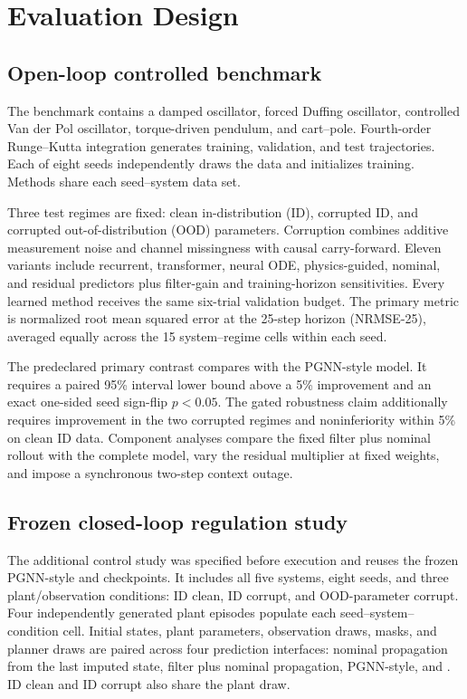 \section{Evaluation Design}

\subsection{Open-loop controlled benchmark}

The benchmark contains a damped oscillator, forced Duffing oscillator,
controlled Van der Pol oscillator, torque-driven pendulum, and cart--pole.
Fourth-order Runge--Kutta integration generates training, validation, and test
trajectories. Each of eight seeds independently draws the data and initializes
training. Methods share each seed--system data set.

Three test regimes are fixed: clean in-distribution (ID), corrupted ID, and
corrupted out-of-distribution (OOD) parameters. Corruption combines additive
measurement noise and channel missingness with causal carry-forward. Eleven
variants include recurrent, transformer, neural ODE, physics-guided, nominal,
and residual predictors plus filter-gain and training-horizon sensitivities.
Every learned method receives the same six-trial validation budget. The primary
metric is normalized root mean squared error at the 25-step horizon
(NRMSE-25), averaged equally across the 15 system--regime cells within each
seed.

The predeclared primary contrast compares \method{} with the PGNN-style model.
It requires a paired 95\% interval lower bound above a 5\% improvement and an
exact one-sided seed sign-flip $p<0.05$. The gated robustness claim additionally
requires improvement in the two corrupted regimes and noninferiority within
5\% on clean ID data. Component analyses compare the fixed filter plus nominal
rollout with the complete model, vary the residual multiplier at fixed weights,
and impose a synchronous two-step context outage.

\subsection{Frozen closed-loop regulation study}

The additional control study was specified before execution and reuses the
frozen PGNN-style and \method{} checkpoints. It includes all five systems,
eight seeds, and three plant/observation conditions: ID clean, ID corrupt, and
OOD-parameter corrupt. Four independently generated plant episodes populate
each seed--system--condition cell. Initial states, plant parameters,
observation draws, masks, and planner draws are paired across four prediction
interfaces: nominal propagation from the last imputed state, filter plus
nominal propagation, PGNN-style, and \method. ID clean and ID corrupt also
share the plant draw.

